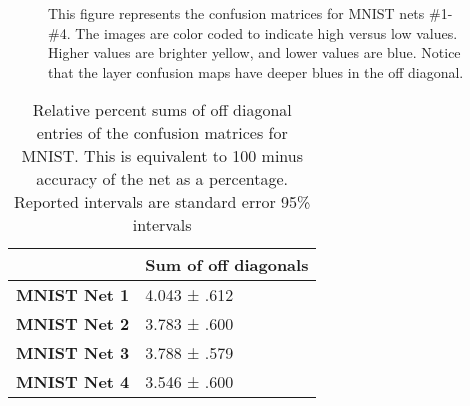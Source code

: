 \begin{figure}[ht]
	\centering
	
	\caption[Confusion matrices for MNIST nets \#1-\#4]{This figure represents the confusion matrices for MNIST nets \#1-\#4.  The images are color coded to indicate high versus low values.  Higher values are brighter yellow, and lower values are blue. Notice that the \RS layer confusion maps have deeper blues in the off diagonal.}
	\label{fig:benfordconfusionstikz}
\end{figure}

\begin{table}[ht]
	\renewcommand{\arraystretch}{1.4}
	\centering
\begin{tabular}{l|l|}
	\cline{2-2}
	& \textbf{Sum of off diagonals} \\ \hline
	\multicolumn{1}{|l|}{\textbf{MNIST Net 1}} & 4.043 ± .612                  \\ \hline
	\multicolumn{1}{|l|}{\textbf{MNIST Net 2}} & 3.783 ± .600                  \\ \hline
	\multicolumn{1}{|l|}{\textbf{MNIST Net 3}} & 3.788 ± .579                  \\ \hline
	\multicolumn{1}{|l|}{\textbf{MNIST Net 4}} & 3.546 ± .600                  \\ \hline
\end{tabular}
	\caption[Accuracy of MNIST training with imbalanced data]{Relative percent sums of off diagonal entries of the confusion matrices for MNIST\null. This is equivalent to 100 minus accuracy of the net as a percentage. Reported intervals are standard error 95\% intervals}
\end{table}

